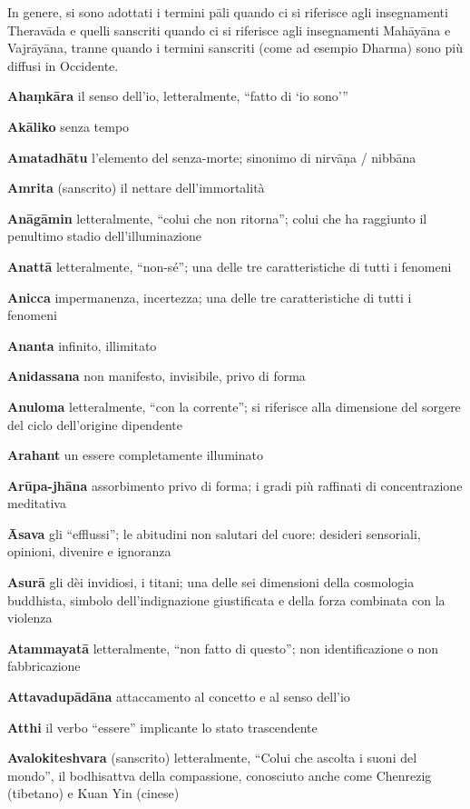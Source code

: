 
\begingroup\setlength{\parindent}{0em}\setlength{\parskip}{0.8em}

In genere, si sono adottati i termini pāli quando ci si riferisce agli insegnamenti Theravāda e quelli sanscriti quando ci si riferisce agli insegnamenti Mahāyāna e Vajrāyāna, tranne quando i termini sanscriti (come ad esempio Dharma) sono più diffusi in Occidente.

\textbf{Ahaṃkāra} il senso dell'io, letteralmente, ``fatto di `io sono'\thinspace''

\textbf{Akāliko} senza tempo

\textbf{Amatadhātu }l'elemento del senza-morte; sinonimo di nirvāṇa / nibbāna

\textbf{Amrita} (sanscrito) il nettare dell'immortalità

\textbf{Anāgāmin} letteralmente, ``colui che non ritorna''; colui che ha raggiunto il penultimo stadio dell'illuminazione

\textbf{Anattā} letteralmente, ``non-sé''; una delle tre caratteristiche di tutti i fenomeni

\textbf{Anicca} impermanenza, incertezza; una delle tre caratteristiche di tutti i fenomeni

\textbf{Ananta }infinito, illimitato

\textbf{Anidassana }non manifesto, invisibile, privo di forma

\textbf{Anuloma }letteralmente, ``con la corrente''; si riferisce alla dimensione del sorgere del ciclo dell'origine dipendente

\textbf{Arahant }un essere completamente illuminato

\textbf{Arūpa-jhāna }assorbimento privo di forma; i gradi più raffinati di concentrazione meditativa

\textbf{Āsava }gli ``efflussi''; le abitudini non salutari del cuore: desideri sensoriali, opinioni, divenire e ignoranza

\textbf{Asurā }gli dèi invidiosi, i titani; una delle sei dimensioni della cosmologia buddhista, simbolo dell'indignazione giustificata e della forza combinata con la violenza

\textbf{Atammayatā }letteralmente, ``non fatto di questo''; non identificazione o non fabbricazione 

\textbf{Attavadupādāna }attaccamento al concetto e al senso dell'io

\textbf{Atthi }il verbo ``essere'' implicante lo stato trascendente

\textbf{Avalokiteshvara }(sanscrito) letteralmente, ``Colui che ascolta i suoni del mondo'', il bodhisattva della compassione, conosciuto anche come Chenrezig (tibetano) e Kuan Yin (cinese)

